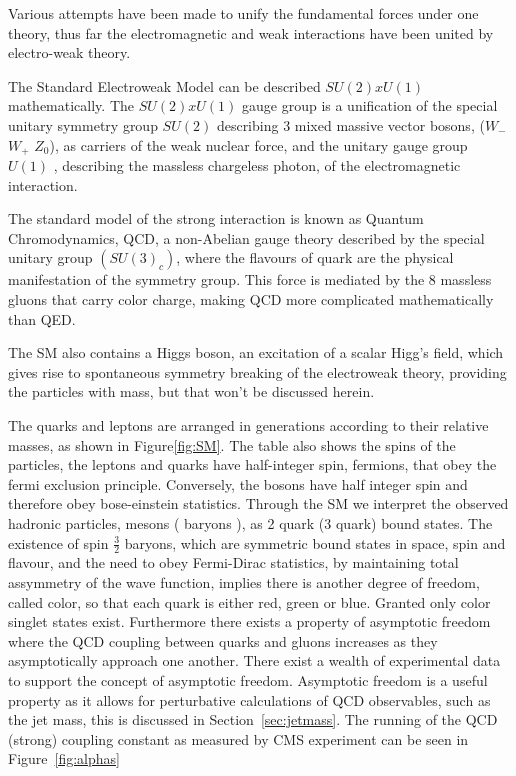Various attempts have been made to unify the fundamental forces under one theory, thus far the electromagnetic and weak interactions have been united by electro-weak theory. 

The Standard Electroweak Model can be described $SU(2) x U(1)$ mathematically.
The  $SU(2) x U(1)$ gauge group is a unification of the special unitary symmetry group $SU(2)$ describing 3 mixed massive vector bosons, ($W_{-}$ $W_{+}$ $Z_0$), as carriers of the weak nuclear force, and the unitary gauge group $U(1)$ , describing the massless chargeless photon, of the electromagnetic interaction.

The standard model of the strong interaction is known as Quantum Chromodynamics, QCD, a non-Abelian gauge theory described by the special unitary group $(SU(3)_c)$, where the flavours of quark are the physical manifestation of the symmetry group. This force is mediated by the 8 massless gluons that carry color charge, making QCD more complicated mathematically than QED.

The SM also contains a Higgs boson, an excitation of a scalar Higg's field, which gives rise to spontaneous symmetry breaking of the electroweak theory, providing the particles with mass, but that won't be discussed herein. 

The quarks and leptons are arranged in generations according to their relative masses, as shown in Figure\ref{fig:SM}. The table also shows the spins of the particles, the leptons and quarks have half-integer spin, fermions, that obey the fermi exclusion principle. Conversely, the bosons have half integer spin and therefore obey bose-einstein statistics. Through the SM we interpret the observed hadronic particles, mesons ( baryons ), as 2 quark (3 quark) bound states. The existence of spin $\frac{3}{2}$ baryons, which are symmetric bound states in space, spin and flavour, and the need to obey Fermi-Dirac statistics, by maintaining total assymmetry of the wave function, implies there is another degree of freedom, called color, so that each quark is either red, green or blue. Granted only color singlet states exist. Furthermore there exists a property of asymptotic freedom where the QCD coupling between quarks and gluons increases as they asymptotically approach one another. There exist a wealth of experimental data to support the concept of asymptotic freedom. Asymptotic freedom is a useful property as it allows for perturbative calculations of QCD observables, such as the jet mass, this is discussed in Section~\ref{sec:jetmass}. The running of the QCD (strong) coupling constant as measured by CMS experiment can be seen in Figure~\ref{fig:alphas}


